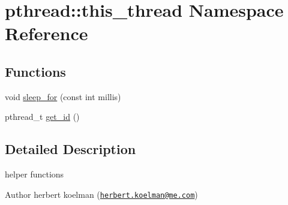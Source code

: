 \hypertarget{namespacepthread_1_1this__thread}{\section{pthread\+:\+:this\+\_\+thread Namespace Reference}
\label{namespacepthread_1_1this__thread}
}
\subsection*{Functions}
\begin{DoxyCompactItemize}
\item 
void \hyperlink{group__threads_ga01ae1b738d3d2dbbfe966b4aad07a0a9}{sleep\+\_\+for} (const int millis)
\item 
pthread\+\_\+t \hyperlink{group__threads_ga57275c7fa3dd5591c7f19ccf451f1fb6}{get\+\_\+id} ()
\end{DoxyCompactItemize}


\subsection{Detailed Description}
helper functions \begin{DoxyAuthor}{Author}
herbert koelman (\href{mailto:herbert.koelman@me.com}{\tt herbert.\+koelman@me.\+com}) 
\end{DoxyAuthor}
